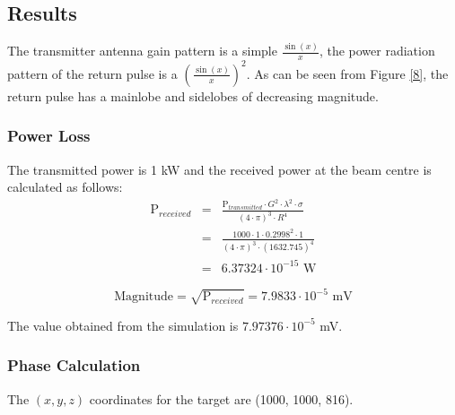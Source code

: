 \subsection{\protect\smallskip Results}

The transmitter antenna gain pattern is a simple $\frac{\sin (x)}{x}$, the
power radiation pattern of the return pulse is a $\left( \frac{\sin (x)}{x}%
\right) ^{2}$. As can be seen from Figure \ref{8}, the return pulse has a
mainlobe and sidelobes of decreasing magnitude.

\smallskip {}

\smallskip

\subsubsection{Power Loss}

\smallskip The transmitted power is 1 kW and the received power at the beam
centre is calculated as follows:\smallskip 
\begin{eqnarray}
\text{P}_{received} &=&\frac{\text{P}_{transmitted}\cdot G^{2}\cdot \lambda
^{2}\cdot \sigma }{(4\cdot \pi )^{3}\cdot R^{4}} \\
&=&\frac{1000\cdot 1\cdot 0.2998^{2}\cdot 1}{(4\cdot \pi )^{3}\cdot
(1632.745)^{4}} \\
&=&6.37324\cdot 10^{-15}\text{ W}
\end{eqnarray}

\smallskip 
\begin{equation}
\text{Magnitude}=\sqrt{\text{P}_{received}}=7.9833\cdot 10^{-5}\text{ mV}
\end{equation}

\smallskip

The value obtained from the simulation is $7.97376\cdot 10^{-5}$ mV.

\subsubsection{\protect\smallskip Phase Calculation}

\smallskip \smallskip The $(x,y,z)$ coordinates for the target are (1000,
1000, 816).

